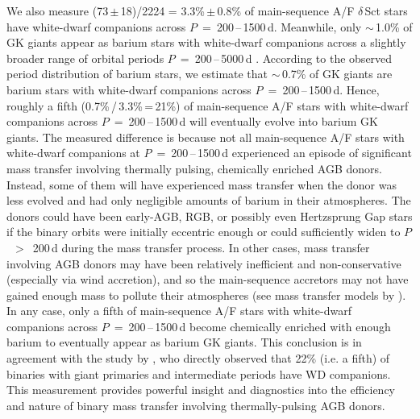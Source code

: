 \documentclass[a4paper,fleqn,usenatbib]{mnras}
\begin{document}
We also measure (73\,$\pm$\,18)/2224 = 3.3\%\,$\pm$\,0.8\% of main-sequence A/F $\delta$\,Sct stars have white-dwarf companions across $P$~=~200\,--\,1500\,d.  Meanwhile, only $\sim$\,1.0\% of GK giants appear as barium stars with white-dwarf companions across a slightly broader range of orbital periods $P$~=~200\,--\,5000\,d \citep{macconnelletal1972,boffin&jorissen1988,jorissenetal1998,karakasetal2000}.  According to the observed period distribution of barium stars, we estimate that $\sim$\,0.7\% of GK giants are barium stars with white-dwarf companions across $P$~=~200\,--\,1500\,d.  Hence, roughly a fifth (0.7\%\,/\,3.3\%\,=\,21\%) of main-sequence A/F stars with white-dwarf companions across $P$~=~200\,--\,1500\,d will eventually evolve into barium GK giants. The measured difference is because not all main-sequence A/F stars with white-dwarf companions at $P$~=~200\,--\,1500\,d experienced an episode of significant mass transfer involving thermally pulsing, chemically enriched AGB donors.  Instead, some of them will have experienced mass transfer when the donor was less evolved and had only negligible amounts of barium in their atmospheres.  The donors could have been early-AGB, RGB, or possibly even Hertzsprung Gap stars if the binary orbits were initially eccentric enough or could sufficiently widen to $P$~$>$~200\,d during the mass transfer process.  In other cases, mass transfer involving AGB donors may have been relatively inefficient and non-conservative (especially via wind accretion), and so the main-sequence accretors may not have gained enough mass to pollute their atmospheres (see mass transfer models by \citealt{karakasetal2000}).  In any case, only a fifth of main-sequence A/F stars with white-dwarf companions across $P$~=~200\,--\,1500\,d become chemically enriched with enough barium to eventually appear as barium GK giants. This conclusion is in agreement with the study by \citet{vanderswaelmenetal2017}, who directly observed that 22\% (i.e. a fifth) of binaries with giant primaries and intermediate periods have WD companions.  This measurement provides powerful insight and diagnostics into the efficiency and nature of binary mass transfer involving thermally-pulsing AGB donors.
\end{document}
